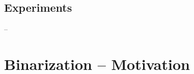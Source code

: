 \documentclass{beamer}
\begin{document}
\begin{frame}[t]{\secname}{}
	\centering
	
\end{frame}


\subsection{Experiments}

\begin{frame}[t]{\secname{} – \subsecname}{}
	\centering
	
\end{frame}


\iffalse
\section{Bottlenecks and Open Problems}

\begin{frame}{\secname}
	\begin{block}{}%
		\begin{itemize}
		\item
			finding the best merger
		\item
			saturating mergers until they preserve determinism
		\item
			heuristics cannot distinguish states with same count
		\item
			Is bottom-up determinism too restrictive?
		\end{itemize}
	\end{block}
\end{frame}
\fi




\section{Binarization – Motivation}
\end{document}
